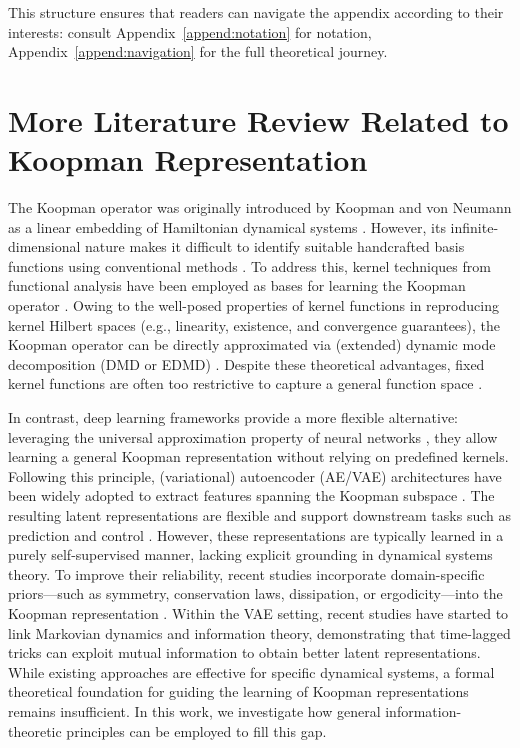 \documentclass{article} %
\begin{document}
This structure ensures that readers can navigate the appendix according to their interests: consult Appendix~\ref{append:notation} for notation, Appendix~\ref{append:navigation} for the full theoretical journey.

\clearpage 
\section{More Literature Review Related to Koopman Representation} \label{append:more_literature_review}

The Koopman operator was originally introduced by Koopman and von Neumann as a linear embedding of Hamiltonian dynamical systems \citep{koopman1931hamiltonian, koopman1932dynamical}. However, its infinite-dimensional nature makes it difficult to identify suitable handcrafted basis functions using conventional methods \citep{brunton2021modern}. To address this, kernel techniques from functional analysis have been employed as bases for learning the Koopman operator \citep{das2020koopman, das2021reproducing, kostic2022learning, bevanda2025koopman}. Owing to the well-posed properties of kernel functions in reproducing kernel Hilbert spaces (e.g., linearity, existence, and convergence guarantees), the Koopman operator can be directly approximated via (extended) dynamic mode decomposition (DMD or EDMD) \citep{williams2015data, takeishi2017learning, arbabi2017ergodic, xu2025reinforced}. Despite these theoretical advantages, fixed kernel functions are often too restrictive to capture a general function space \citep{berlinet2011reproducing, alpay2012reproducing}.

In contrast, deep learning frameworks provide a more flexible alternative: leveraging the universal approximation property of neural networks \citep{baker1998universal, kidger2020universal}, they allow learning a general Koopman representation without relying on predefined kernels. Following this principle, (variational) autoencoder (AE/VAE) architectures have been widely adopted to extract features spanning the Koopman subspace \citep{liu2023koopa, wu2025k, xu2025data, xu2025reskoopnet}. The resulting latent representations are flexible and support downstream tasks such as prediction and control \citep{li2019learning, mauroy2020koopman, korda2020optimal, weissenbacher2022koopman}. However, these representations are typically learned in a purely self-supervised manner, lacking explicit grounding in dynamical systems theory. To improve their reliability, recent studies incorporate domain-specific priors—such as symmetry, conservation laws, dissipation, or ergodicity—into the Koopman representation \citep{vaidya2008lyapunov, weissenbacher2022koopman, azencot2020forecasting, cheng2025learning}. Within the VAE setting, recent studies \citep{federici2023latent} have started to link Markovian dynamics and information theory, demonstrating that time-lagged tricks can exploit mutual information to obtain better latent representations. While existing approaches are effective for specific dynamical systems, a formal theoretical foundation for guiding the learning of Koopman representations remains insufficient. In this work, we investigate how general information-theoretic principles can be employed to fill this gap. 
\end{document}
